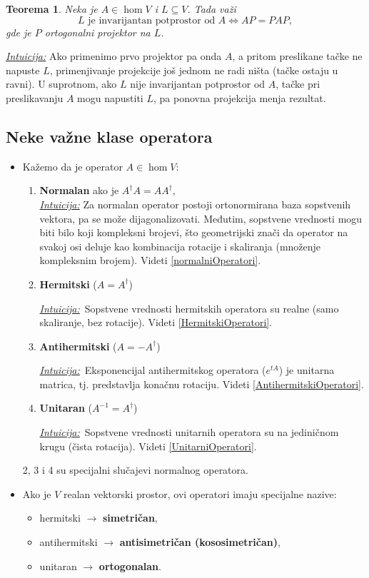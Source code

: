 \documentclass[a4paper,12pt,twoside]{report}
\newtheorem{theorem}{Teorema}[section]
\numberwithin{algorithm}{section}
\newcommand{\intuicija}{\noindent\underline{\textit{Intuicija:}}\ }
\begin{document}
\begin{theorem}
    Neka je $A \in \hom V$ i $L \subseteq V$. Tada važi
    \[ L \text{ je invarijantan potprostor od } A \iff AP = PAP, \]
    gde je $P$ ortogonalni projektor na $L$.
\end{theorem}
\noindent\underline{\textit{Intuicija:}} Ako primenimo prvo projektor pa onda $A$, a pritom preslikane tačke ne napuste $L$, 
primenjivanje projekcije još jednom ne radi ništa (tačke ostaju u ravni). U suprotnom, ako $L$ nije invarijantan potprostor od 
$A$, tačke pri preslikavanju $A$ mogu napustiti $L$, pa ponovna projekcija menja rezultat.

\subsection{Neke važne klase operatora}
\label{NekeVazneKlaseOperatora}
\begin{itemize}
    \item Kažemo da je operator $A \in \hom V$:
    
    \begin{enumerate}
        \item \textbf{Normalan} ako je $A^\dagger A = A A^\dagger $,\\
        \noindent\underline{\textit{Intuicija:}} Za normalan operator postoji ortonormirana baza sopstvenih vektora, pa se može dijagonalizovati. 
        Međutim, sopstvene vrednosti mogu biti bilo koji kompleksni brojevi, što geometrijski znači da operator na svakoj osi deluje kao kombinacija rotacije 
        i skaliranja (množenje kompleksnim brojem). Videti \ref{normalniOperatori}.
        \item \textbf{Hermitski} ($A=A^\dagger$)
        
        \intuicija Sopstvene vrednosti hermitskih operatora su realne (samo skaliranje, bez rotacije). Videti \ref{HermitskiOperatori}.
        \item \textbf{Antihermitski} ($A = -A^\dagger$)
        
        \intuicija Eksponencijal antihermitskog operatora ($e^{tA}$) je unitarna matrica, tj. predstavlja konačnu rotaciju. Videti \ref{AntihermitskiOperatori}.

        \item \textbf{Unitaran} ($A^{-1} = A^\dagger$)
        
        \intuicija Sopstvene vrednosti unitarnih operatora su na jediničnom krugu (čista rotacija). Videti \ref{UnitarniOperatori}.
    \end{enumerate}
    2, 3 i 4 su specijalni slučajevi normalnog operatora.
    \item Ako je $V$ realan vektorski prostor, ovi operatori imaju specijalne nazive:
    \begin{itemize}
        \item hermitski $\rightarrow$ \textbf{simetričan},
        \item antihermitski $\rightarrow$ \textbf{antisimetričan (kososimetričan)},
        \item unitaran $\rightarrow$ \textbf{ortogonalan}.
    \end{itemize}
\end{itemize}
\end{document}

